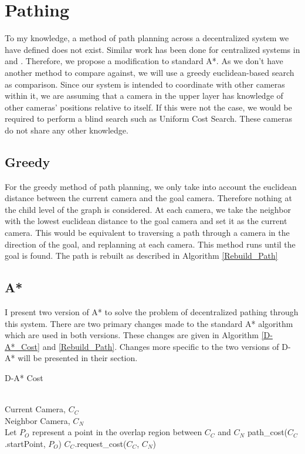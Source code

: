 \section{Pathing}
To my knowledge, a method of path planning across a decentralized system we have defined does not exist. Similar work has been done for centralized systems in \cite{FTC-A} and \cite{CTF-A}. Therefore, we propose a modification to standard A*. As we don't have another method to compare against, we will use a greedy euclidean-based search as comparison. Since our system is intended to coordinate with other cameras within it, we are assuming that a camera in the upper layer has knowledge of other cameras' positions relative to itself. If this were not the case, we would be required to perform a blind search such as Uniform Cost Search. These cameras do not share any other knowledge.

\subsection{Greedy}
For the greedy method of path planning, we only take into account the euclidean distance between the current camera and the goal camera. Therefore nothing at the child level of the graph is considered. At each camera, we take the neighbor with the lowest euclidean distance to the goal camera and set it as the current camera. This would be equivalent to traversing a path through a camera in the direction of the goal, and replanning at each camera. This method runs until the goal is found. The path is rebuilt as described in Algorithm \ref{Rebuild_Path}

\subsection{A*}
I present two version of A* to solve the problem of decentralized pathing through this system. There are two primary changes made to the standard A* algorithm which are used in both versions. These changes are given in Algorithm \ref{D-A*_Cost} and \ref{Rebuild_Path}. Changes more specific to the two versions of D-A* will be presented in their section. 

\begin{algorithm}[h]
\caption{D-A* Cost}
\label{D-A*_Cost}
\begin{algorithmic}[1]
\REQUIRE \ \\
Current Camera, $C_C$ \\
Neighbor Camera, $C_N$ \\
	\STATE Let $P_O$ represent a point in the overlap region between $C_C$ and $C_N$
	\RETURN path\_cost($C_C$.startPoint, $P_O$)
\ELSE
	\RETURN $C_C$.request\_cost($C_C$, $C_N$)
\ENDIF
\end{algorithmic}
\end{algorithm}

